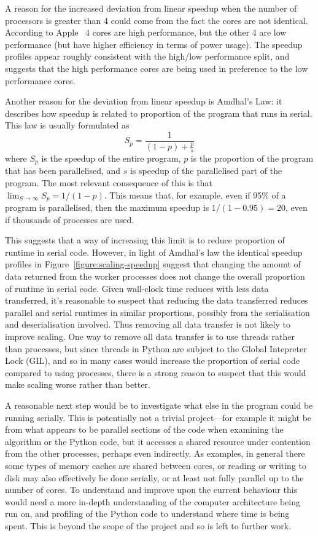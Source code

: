 \documentclass[logo,msc,dsti]{style/infthesis}    %
\begin{document}
{A reason for the increased deviation from linear speedup when the number of processors is greater than 4 could come from the fact the cores are not identical. According to Apple~\cite{AppleM1Overview} 4 cores are high performance, but the other 4 are low performance (but have higher efficiency in terms of power usage). The speedup profiles appear roughly consistent with the high/low performance split, and suggests that the high performance cores are being used in preference to the low performance cores.

Another reason for the deviation from linear speedup is Amdhal's Law: it describes how speedup is related to proportion of the program that runs in serial. This law is usually formulated as
%
\begin{equation*}
S_p = \frac{1}{(1-p) + \frac{p}{s}}
\end{equation*}
%
where $S_p$ is the speedup of the entire program, $p$ is the proportion of the program that has been parallelised, and $s$ is speedup of the parallelised part of the program. The most relevant consequence of this is that $\lim_{S\to\infty} S_p = 1/\left(1-p\right)$. This means that, for example, even if 95\% of a program is parallelised, then the maximum speedup is $1 / \left(1-0.95\right)=20$, even if thousands of processes are used.

This suggests that a way of increasing this limit is to reduce proportion of runtime in serial code. However, in light of Amdhal's law the identical speedup profiles in Figure~\ref{figure:scaling-speedup} suggest that changing the amount of data returned from the worker processes does not change the overall proportion of runtime in serial code. Given wall-clock time reduces with less data transferred, it's reasonable to suspect that reducing the data transferred reduces parallel and serial runtimes in similar proportions, possibly from the serialisation and deserialisation involved. Thus removing all data transfer is not likely to improve scaling. One way to remove all data transfer is to use threads rather than processes, but since threads in Python are subject to the Global Intepreter Lock (GIL), and so in many cases would increase the proportion of serial code compared to using processes, there is a strong reason to suspect that this would make scaling worse rather than better.

A reasonable next step would be to investigate what else in the program could be running serially. This is potentially not a trivial project---for example it might be from what appears to be parallel sections of the code when examining the algorithm or the Python code, but it accesses a shared resource under contention from the other processes, perhaps even indirectly. As examples, in general there some types of memory caches are shared between cores, or reading or writing to disk  may also effectively be done serially, or at least not fully parallel up to the number of cores. To understand and improve upon the current behaviour this would need a more in-depth understanding of the computer architecture being run on, and profiling of the Python code to understand where time is being spent. This is beyond the scope of the project and so is left to further work.

}
\end{document}
